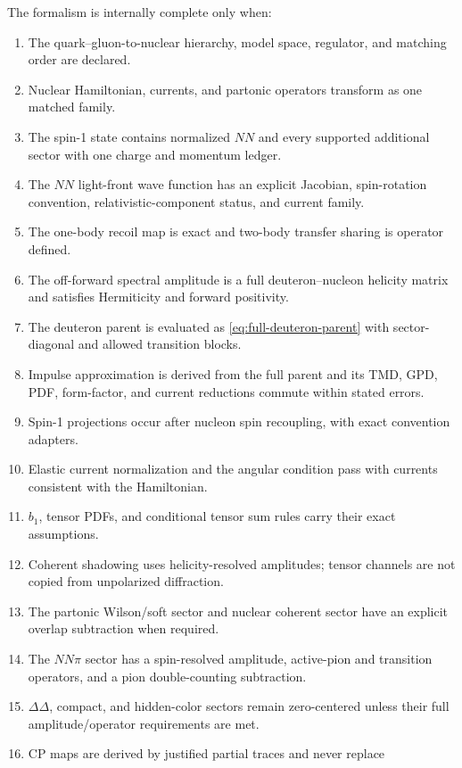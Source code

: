 \documentclass[11pt]{article}
\begin{document}
The formalism is internally complete only when:
\begin{enumerate}
\item The quark--gluon-to-nuclear hierarchy, model space, regulator, and
      matching order are declared.
\item Nuclear Hamiltonian, currents, and partonic operators transform as one
      matched family.
\item The spin-1 state contains normalized \(NN\) and every supported
      additional sector with one charge and momentum ledger.
\item The \(NN\) light-front wave function has an explicit Jacobian,
      spin-rotation convention, relativistic-component status, and current
      family.
\item The one-body recoil map is exact and two-body transfer sharing is
      operator defined.
\item The off-forward spectral amplitude is a full deuteron--nucleon helicity
      matrix and satisfies Hermiticity and forward positivity.
\item The deuteron parent is evaluated as
      \cref{eq:full-deuteron-parent} with sector-diagonal and allowed
      transition blocks.
\item Impulse approximation is derived from the full parent and its TMD, GPD,
      PDF, form-factor, and current reductions commute within stated errors.
\item Spin-1 projections occur after nucleon spin recoupling, with exact
      convention adapters.
\item Elastic current normalization and the angular condition pass with
      currents consistent with the Hamiltonian.
\item \(b_1\), tensor PDFs, and conditional tensor sum rules carry their
      exact assumptions.
\item Coherent shadowing uses helicity-resolved amplitudes; tensor channels are
      not copied from unpolarized diffraction.
\item The partonic Wilson/soft sector and nuclear coherent sector have an
      explicit overlap subtraction when required.
\item The \(NN\pi\) sector has a spin-resolved amplitude, active-pion and
      transition operators, and a pion double-counting subtraction.
\item \(\Delta\Delta\), compact, and hidden-color sectors remain zero-centered
      unless their full amplitude/operator requirements are met.
\item CP maps are derived by justified partial traces and never replace

\end{enumerate}
\end{document}
